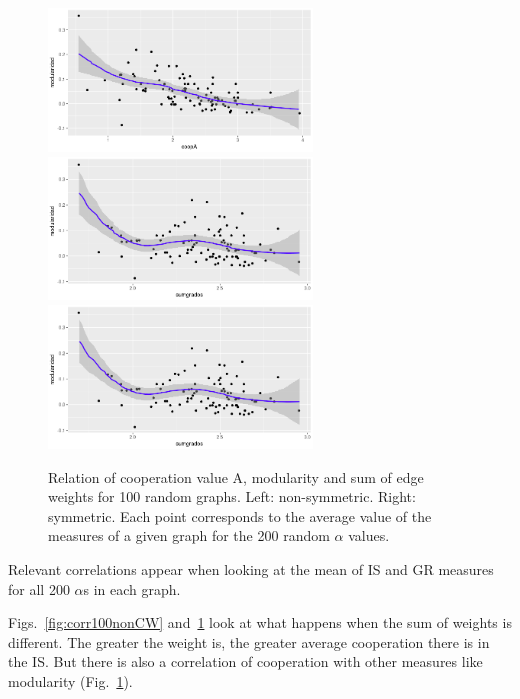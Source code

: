 \documentclass{article}
\begin{document}
\begin{figure}[htbp!]
  \includegraphics[width=7cm]{img/coopAmodS100nonCW}\\
  \includegraphics[width=7cm]{img/sumGmod100nonCW}\quad\quad
  \includegraphics[width=7cm]{img/sumGmodS100nonCW}\\
  \caption{Relation of cooperation value A, modularity and sum of edge
  weights for 100 random graphs. Left: non-symmetric. Right:
  symmetric. Each point corresponds to the average value of the
  measures of a given graph for the 200 random $\alpha$ values.}
  \label{fig:copSumMod100nonCW}
\end{figure}

Relevant correlations appear when looking at the mean of IS and
GR measures for all 200 $\alpha$s in each graph.

Figs.~\ref{fig:corr100nonCW} and~\ref{fig:copSumMod100nonCW} look at
what happens when the sum of weights is different. The greater the
weight is, the greater average cooperation there is in the IS. But
there is also a correlation of cooperation with other measures like
modularity (Fig.~\ref{fig:copSumMod100nonCW}). 
\end{document}
